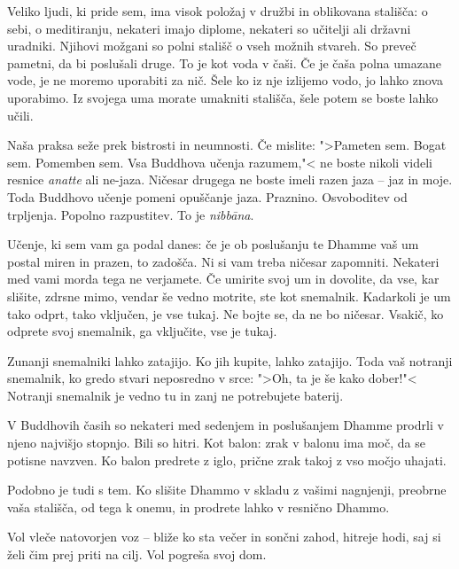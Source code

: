 \clearpage


Veliko ljudi, ki pride sem, ima visok položaj v družbi in oblikovana stališča: o sebi, o meditiranju, nekateri imajo diplome, nekateri so učitelji ali državni uradniki. Njihovi možgani so polni stališč o vseh možnih stvareh. So preveč pametni, da bi poslušali druge. To je kot voda v čaši. Če je čaša polna umazane vode, je ne moremo uporabiti za nič. Šele ko iz nje izlijemo vodo, jo lahko znova uporabimo. Iz svojega uma morate umakniti stališča, šele potem se boste lahko učili.

Naša praksa seže prek bistrosti in neumnosti. Če mislite: ">Pameten sem. Bogat sem. Pomemben sem. Vsa Buddhova učenja razumem,"< ne boste nikoli videli resnice \emph{anatte} ali ne-jaza. Ničesar drugega ne boste imeli razen jaza – jaz in moje. Toda Buddhovo učenje pomeni opuščanje jaza. Praznino. Osvoboditev od trpljenja. Popolno razpustitev. To je \emph{nibbāna}.

\clearpage


Učenje, ki sem vam ga podal danes: če je ob poslušanju te Dhamme vaš um postal miren in prazen, to zadošča. Ni si vam treba ničesar zapomniti. Nekateri med vami morda tega ne verjamete. Če umirite svoj um in dovolite, da vse, kar slišite, zdrsne mimo, vendar še vedno motrite, ste kot snemalnik. Kadarkoli je um tako odprt, tako vključen, je vse tukaj. Ne bojte se, da ne bo ničesar. Vsakič, ko odprete svoj snemalnik, ga vključite, vse je tukaj.

Zunanji snemalniki lahko zatajijo. Ko jih kupite, lahko zatajijo. Toda vaš notranji snemalnik, ko gredo stvari neposredno v srce: ">Oh, ta je še kako dober!"< Notranji snemalnik je vedno tu in zanj ne potrebujete baterij.

\clearpage


V Buddhovih časih so nekateri med sedenjem in poslušanjem Dhamme prodrli v njeno najvišjo stopnjo. Bili so hitri. Kot balon: zrak v balonu ima moč, da se potisne navzven. Ko balon predrete z iglo, prične zrak takoj z vso močjo uhajati.

Podobno je tudi s tem. Ko slišite Dhammo v skladu z vašimi nagnjenji, preobrne vaša stališča, od tega k onemu, in prodrete lahko v resnično Dhammo.


Vol vleče natovorjen voz – bliže ko sta večer in sončni zahod, hitreje hodi, saj si želi čim prej priti na cilj. Vol pogreša svoj dom.


